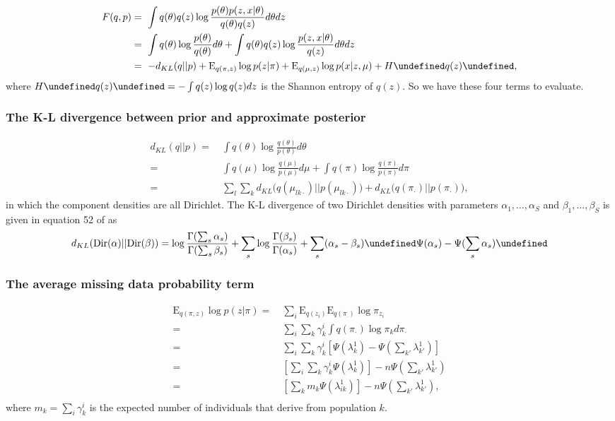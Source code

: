 \documentclass[12pt,a4paper,reqno]{article}
\newcommand{\E}{\text{E}{}}
\let\(\undefined
\let\)\undefined
\newcommand{\(}{\left(}
\newcommand{\)}{\right)}
\newcommand{\|}{\arrowvert}
\renewcommand{\digamma}{\Psi}
\begin{document}
\begin{align*}
  F(q,p) 
&=~ \int q(\theta)q(z)\log \frac{p(\theta)p(z,x|\theta)}{q(\theta)q(z)} d\theta dz\\
&=~ \int q(\theta)\log \frac{p(\theta)}{q(\theta)} d\theta + \int q(\theta)q(z)\log \frac{p(z,x|\theta)}{q(z)} d\theta dz\\
&=~ -d_{KL}(q||p) + \E_{q(\pi,z)}\log p(z|\pi) + \E_{q(\mu,z)} \log p(x|z,\mu) + H\(q(z)\),\\
\end{align*}
where $H\(q(z)\) = -\int q(z)\log q(z) dz$ is the Shannon entropy of $q(z)$. So we have these four terms to evaluate.

\subsubsection{The K-L divergence between prior and approximate posterior} \label{KL-term-no-admix}
\begin{align*}
  d_{KL}(q||p)
  =&~ \int q(\theta)\log \frac{q(\theta)}{p(\theta)} d\theta \\
  =&~ \int q(\mu) \log \frac{q(\mu)}{p(\mu)} d\mu + \int q(\pi) \log \frac{q(\pi)}{p(\pi)} d\pi\\
  =&~ \sum_{l} \sum_{k} d_{KL}\Big(q(\mu_{lk\cdot})||p(\mu_{lk\cdot})\Big) + d_{KL}\Big(q(\pi_{\cdot})||p(\pi_{\cdot})\Big),
   \end{align*}
in which the component densities are all Dirichlet. The K-L divergence of two Dirichlet densities with parameters $\alpha_{1},\ldots,\alpha_{S}$ and $\beta_{1},\ldots,\beta_{S}$ is given in equation 52 of \cite{penny-roberts-2000} as
\begin{align*}
d_{KL}(\text{Dir}(\mathbf \alpha) || \text{Dir}(\mathbf\beta)) = 
\log \frac{\Gamma(\sum_{s}\alpha_{s})}{\Gamma(\sum_{s}\beta_{s})} + 
\sum_{s} \log \frac{\Gamma(\beta_{s})}{\Gamma(\alpha_{s})} +
\sum_{s}(\alpha_{s} - \beta_{s})\(\Psi(\alpha_{s}) - \Psi(\sum_{s}\alpha_{s})\)
\end{align*}


\subsubsection{The average missing data probability term}
\begin{align*}
  \E_{q(\pi,z)}\log p(z|\pi) 
  =&~ \sum_{i} \E_{q(z_{i})}\E_{q(\pi_{\cdot})} \log \pi_{z_{i}} \\
  =&~ \sum_{i} \sum_{k} \gamma^{i}_{k} \int q(\pi_{\cdot}) \log \pi_{k} d\pi_{\cdot} \\
  =&~ \sum_{i} \sum_{k} \gamma^{i}_{k} \left[\digamma(\lambda^{1}_{k}) - \digamma(\sum_{k'}\lambda^{1}_{k'})\right] \\
  =&~ \left[ \sum_{i} \sum_{k} \gamma^{i}_{k} \digamma(\lambda^{1}_{k})\right] - n\digamma(\sum_{k'}\lambda^{1}_{k'})\\
  =&~ \left[ \sum_{k} m_{k} \digamma(\lambda^{1}_{ik})\right] - n\digamma(\sum_{k'}\lambda^{1}_{k'}),\\
\end{align*}
where $m_{k} = \sum_{i} \gamma^{i}_{k}$ is the expected number of individuals that derive from population $k$.
\end{document}
